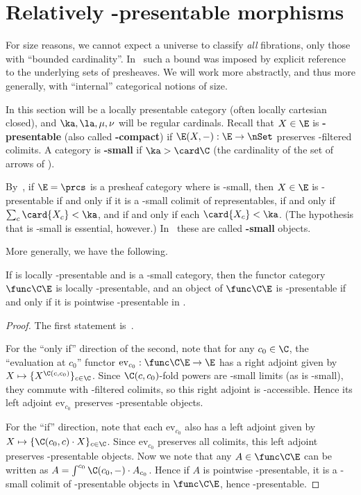 \section{Relatively \ka-presentable morphisms}
\label{sec:relpres}

For size reasons, we cannot expect a universe to classify \emph{all} fibrations, only those with ``bounded cardinality''.
In~\cite{klv:ssetmodel,shulman:elreedy,cisinski:elegant} such a bound was imposed by explicit reference to the underlying sets of presheaves.
We will work more abstractly, and thus more generally, with ``internal'' categorical notions of size.

In this section \E will be a locally presentable category (often locally cartesian closed), and $\ka,\la,\mu,\nu$ will be regular cardinals.
Recall that $X\in\E$ is \textbf{\ka-presentable} (also called \textbf{\ka-compact}) if $\E(X,-):\E\to\nSet$ preserves \ka-filtered colimits.
A category \sC is \textbf{\ka-small} if $\ka>\card\C$ (the cardinality of the set of arrows of \C).

\begin{eg}\label{eg:pshf-pres}
  By~\cite[Example 1.31]{ar:loc-pres}, if $\E=\prcs$ is a presheaf category where \C is \ka-small, then $X\in\E$ is \ka-presentable if and only if it is a \ka-small colimit of representables, if and only if $\sum_c \card{X_c} < \ka$, and if and only if each $\card{X_c}<\ka$.
  (The hypothesis that \C is \ka-small is essential, however.)
  In~\cite{klv:ssetmodel,shulman:elreedy} these are called \textbf{\ka-small} objects.
\end{eg}

More generally, we have the following.

\begin{lem}\label{thm:pw-pres}
  If \E is locally \ka-presentable and \C is a \ka-small category, then the functor category $\func\C\E$ is locally \ka-presentable, and an object of $\func\C\E$ is \ka-presentable if and only if it is pointwise \ka-presentable in \E.
\end{lem}
\begin{proof}
  The first statement is~\cite[Corollary 1.54]{ar:loc-pres}.

  For the ``only if'' direction of the second, note that for any $c_0\in \C$, the ``evaluation at $c_0$'' functor $\mathrm{ev}_{c_0} : \func\C\E \to \E$ has a right adjoint given by $X \mapsto \{ X^{\C(c,c_0)} \}_{c\in \C}$.
  Since $\C(c,c_0)$-fold powers are \ka-small limits (as \C is \ka-small), they commute with \ka-filtered colimits, so this right adjoint is \ka-accessible.
  Hence its left adjoint $\mathrm{ev}_{c_0}$ preserves \ka-presentable objects.

  For the ``if'' direction, note that each $\mathrm{ev}_{c_0}$ also has a left adjoint given by $X \mapsto \{ \C(c_0,c) \cdot X \}_{c\in \C}$.
  Since $\mathrm{ev}_{c_0}$ preserves all colimits, this left adjoint preserves \ka-presentable objects.
  Now we note that any $A\in \func\C\E$ can be written as $A = \int^{c_0} \C(c_0,-) \cdot A_{c_0}$.
  Hence if $A$ is pointwise \ka-presentable, it is a \ka-small colimit of \ka-presentable objects in $\func\C\E$, hence \ka-presentable.
\end{proof}

